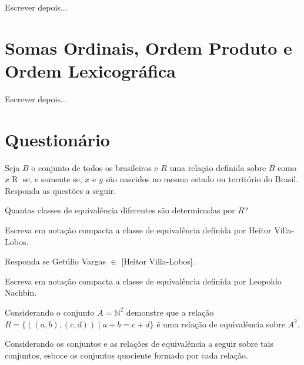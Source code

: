 Escrever depois...

\section{Somas Ordinais, Ordem Produto e Ordem Lexicográfica}\label{sec:OperacoesPoset}

Escrever depois...

\section{Questionário}\label{sec:Questionario4part1}

\begin{problem}\label{prob:EquivalenciaOrdem1}
	Seja $B$ o conjunto de todos os brasileiros e $R$ uma relação definida sobre $B$ como $x \mathrel{R}$ se, e somente se, $x$ e $y$ são nascidos no mesmo estado ou território do Brasil. Responda as questões a seguir.
\end{problem}

\begin{exerList}
	\item Quantas classes de equivalência diferentes são determinadas por $R$?
	\item Escreva em notação compacta a classe de equivalência definida por Heitor Villa-Lobos.
	\item Responda se Getúlio Vargas $\in$ [Heitor Villa-Lobos].
	\item Escreva em notação compacta a classe de equivalência definida por Leopoldo Nachbin.
\end{exerList}

\begin{problem}\label{prob:EquivalenciaOrdem2}
	Considerando o conjunto $A = \mathbb{N}^2$ demonstre que a relação $R = \{((a, b), (c, d)) \mid a+b = c+d\}$ é uma relação de equivalência sobre $A^2$.
\end{problem}

\begin{problem}\label{prob:EquivalenciaOrdem3}
	Considerando os conjuntos e as relações de equivalência a seguir sobre tais conjuntos, esboce os conjuntos quociente formado por cada relação.
\end{problem}

